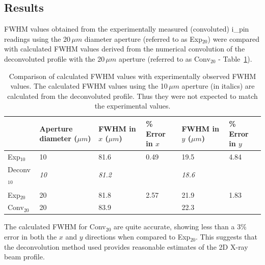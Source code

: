 \subsection{Results}
\label{sub:Results - DLS}
FWHM values obtained from the experimentally measured (convoluted) i\_pin readings using the 20$\,\mu m$ diameter aperture (referred to as Exp$_{\text{20}}$) were compared with calculated FWHM values derived from the numerical convolution of the deconvoluted profile with the 20$\,\mu m$ aperture (referred to as Conv$_{\text{20}}$ - Table~\ref{tab:FWHM comparison - DLS}).
\begin{table}[h!]
	\caption[Comparison of calculated FWHM values with experimentally observed FWHM values.]{Comparison of calculated FWHM values with experimentally observed FWHM values.
    The calculated FWHM values using the 10$\,\mu m$ aperture (in italics) are calculated from the deconvoluted profile.
    Thus they were not expected to match the experimental values.}
	\begin{tabular}{p{2.5cm} p{2.5cm} p{2cm} p{1.5cm} p{2cm} p{1.5cm}}
        &  Aperture diameter ($\mu m$) & FWHM in $x$ ($\mu m$) 	&	\% Error in $x$		& FWHM in $y$ ($\mu m$) 	&	\% Error in $y$ \\
		\hline
		Exp$_{\text{10}}$         & 10              & 81.6 	            &	0.49      & 19.5 	        & 4.84	\\
		Deconv$_{\text{10}}$      & \textit{10}     & \textit{81.2}     &  	          & \textit{18.6} 	&		\\
                                  &                 &			        &			  &    		        &		\\
        Exp$_{\text{20}}$         & 20              & 81.8              &   2.57      & 21.9            & 1.83  \\
		Conv$_{\text{20}}$        & 20              & 83.9              &             & 22.3            &    	\\
	\end{tabular}
	\label{tab:FWHM comparison - DLS}
\end{table}
The calculated FWHM for Conv$_{\text{20}}$ are quite accurate, showing less than a 3\% error in both the $x$ and $y$ directions when compared to Exp$_{\text{20}}$.
This suggests that the deconvolution method used provides reasonable estimates of the 2D X-ray beam profile.

